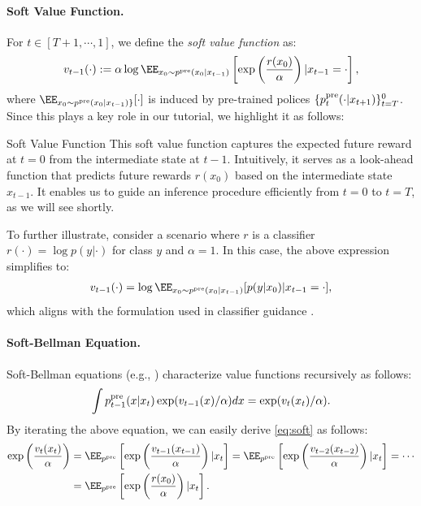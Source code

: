 \paragraph{Soft Value Function.} For $t \in [T+1, \cdots, 1]$, we define the \emph{soft value function} as:
\begin{align}\label{eq:soft}
     v_{t-1}(\cdot ):=\alpha \log \EE_{x_0 \sim p^{\pre}(x_0|x_{t-1})}\left [\exp\left (\frac{r(x_0)}{\alpha} \right)|x_{t-1}=\cdot \right ], 
\end{align}
where $\EE_{x_0\sim p^{\pre}(x_0|x_{t-1})\}}[\cdot]$ is induced by pre-trained polices $\{ p^{\mathrm{pre}}_{t}(\cdot|x_{t+1})\}_{t=T}^0$. Since this plays a key role in our tutorial, we highlight it as follows: 

\begin{AIbox}{Soft Value Function} This soft value function captures the expected future reward at $t=0$ from the intermediate state at $t-1$. Intuitively, it serves as a look-ahead function that predicts future rewards $r(x_0)$ based on the intermediate state $x_{t-1}$. It enables us to guide an inference procedure efficiently from $t=0$ to $t=T$, as we will see shortly.  
\end{AIbox}



To further illustrate, consider a scenario where $r$ is a classifier $r(\cdot )=\log p(y|\cdot)$ for class $y$ and $\alpha = 1$. In this case, the above expression simplifies to:
\begin{align*}
    v_{t-1}(\cdot) = \log \EE_{x_0 \sim p^{\pre}(x_0|x_{t-1})}[p(y|x_0)|x_{t-1}=\cdot ], 
\end{align*}
which aligns with the formulation used in classifier guidance \citep{dhariwal2021diffusion,song2021score}.

\paragraph{Soft-Bellman Equation.} Soft-Bellman equations (e.g., \citet{haarnoja2017reinforcement,geist2019theory}) characterize value functions recursively as follows:
\begin{align}\label{eq:soft_bellman}
    \int p^{\mathrm{pre}}_{t-1}(x|x_{t})\exp(v_{t-1}(x)/\alpha)dx = \exp(v_{t}(x_t)/\alpha). 
\end{align}
By iterating the above equation, we can easily derive \eqref{eq:soft} as follows:
\begin{align*}
    \exp\left ( \frac{v_{t}(x_t)}{\alpha} \right) &= \EE_{p^{\pre}}\left [ \exp\left (\frac{v_{t-1}(x_{t-1})}{\alpha} \right)|x_t \right ]=\EE_{p^{\pre}}\left [\exp\left ( \frac{v_{t-2}(x_{t-2})}{\alpha } \right) |x_t\right ]=\cdots \\
     &=\EE_{p^{\pre}}\left [ \exp\left (\frac{r(x_{0})}{\alpha}\right ) |x_t \right ]. 
\end{align*}

